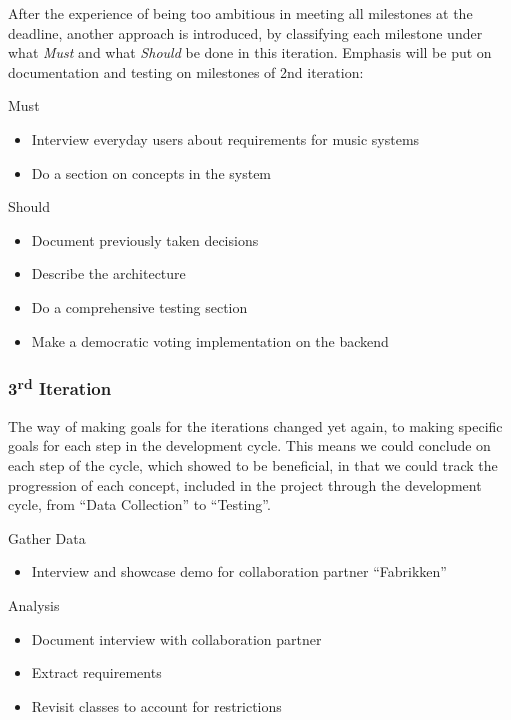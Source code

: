 After the experience of being too ambitious in meeting all milestones at the deadline, another approach is introduced, by classifying each milestone under what \emph{Must} and what \emph{Should} be done in this iteration. Emphasis will be put on documentation and testing on milestones of 2nd iteration:

Must
\begin{itemize}
        \item Interview everyday users about requirements for music systems
        \item Do a section on concepts in the system
\end{itemize}

Should
\begin{itemize}
        \item Document previously taken decisions
        \item Describe the architecture
        \item Do a comprehensive testing section
        \item Make a democratic voting implementation on the backend
\end{itemize}

\subsubsection{3\textsuperscript{rd} Iteration}

The way of making goals for the iterations changed yet again, to making specific goals for each step in the development cycle. This means we could conclude on each step of the cycle, which showed to be beneficial, in that we could track the progression of each concept, included in the project through the development cycle, from \enquote{Data Collection} to \enquote{Testing}.

Gather Data
\begin{itemize}
  \item Interview and showcase demo for collaboration partner \enquote{Fabrikken}
\end{itemize}

Analysis
\begin{itemize}
  \item Document interview with collaboration partner
  \item Extract requirements
  \item Revisit classes to account for restrictions
\end{itemize}

